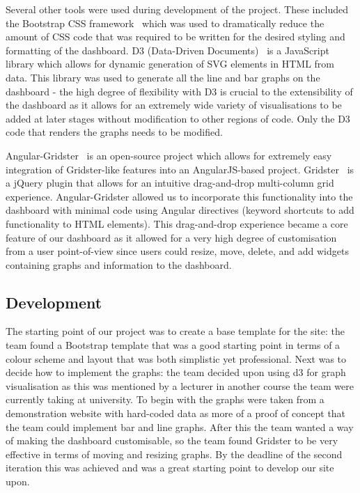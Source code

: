 \documentclass{l3proj}
\begin{document}
Several other tools were used during development of the project. These included the Bootstrap CSS framework~\cite{Bootstrap} which was used to dramatically reduce the amount of CSS code that was required to be written for the desired styling and formatting of the dashboard. D3 (Data-Driven Documents)~\cite{d3Webpage} is a JavaScript library which allows for dynamic generation of SVG elements in HTML from data. This library was used to generate all the line and bar graphs on the dashboard - the high degree of flexibility with D3 is crucial to the extensibility of the dashboard as it allows for an extremely wide variety of visualisations to be added at later stages without modification to other regions of code. Only the D3 code that renders the graphs needs to be modified.

Angular-Gridster~\cite{AngularGridster} is an open-source project which allows for extremely easy integration of Gridster-like features into an AngularJS-based project. Gridster~\cite{Gridster} is a jQuery plugin that allows for an intuitive drag-and-drop multi-column grid experience. Angular-Gridster allowed us to incorporate this functionality into the dashboard with minimal code using Angular directives (keyword shortcuts to add functionality to HTML elements). This drag-and-drop experience became a core feature of our dashboard as it allowed for a very high degree of customisation from a user point-of-view since users could resize, move, delete, and add widgets containing graphs and information to the dashboard.

\subsection{Development}
\label{sec:system-implementation:development}

The starting point of our project was to create a base template for the site: the team found a Bootstrap template that was a good starting point in terms of a colour scheme and layout that was both simplistic yet professional. Next was to decide how to implement the graphs: the team decided upon using d3 for graph visualisation as this was mentioned by a lecturer in another course the team were currently taking at university. To begin with the graphs were taken from a demonstration website with hard-coded data as more of a proof of concept that the team could implement bar and line graphs. After this the team wanted a way of making the dashboard customisable, so the team found Gridster to be very effective in terms of moving and resizing graphs. By the deadline of the second iteration this was achieved and was a great starting point to develop our site upon.
\end{document}
